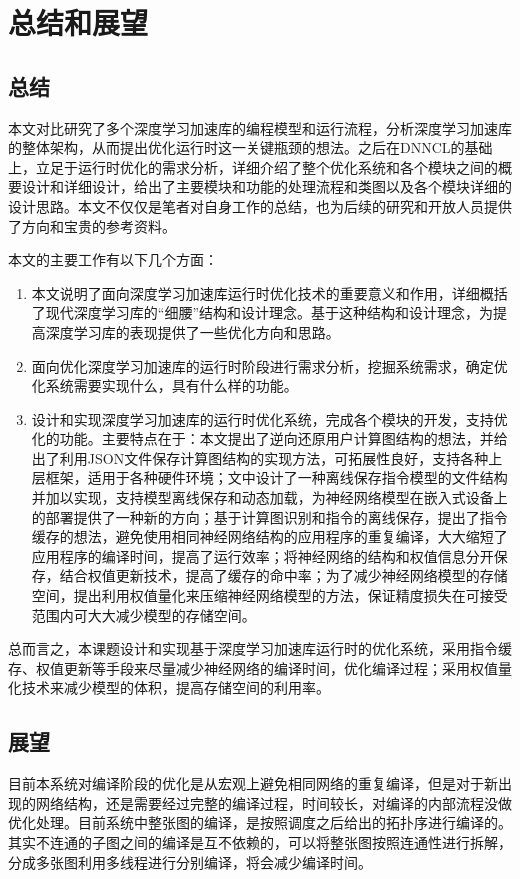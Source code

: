 
\chapter{总结和展望}

\section {总结}

本文对比研究了多个深度学习加速库的编程模型和运行流程，分析深度学习加速库的整体架构，从而提出优化运行时这一关键瓶颈的想法。之后在DNNCL的基础上，立足于运行时优化的需求分析，详细介绍了整个优化系统和各个模块之间的概要设计和详细设计，给出了主要模块和功能的处理流程和类图以及各个模块详细的设计思路。本文不仅仅是笔者对自身工作的总结，也为后续的研究和开放人员提供了方向和宝贵的参考资料。

本文的主要工作有以下几个方面：
\begin{enumerate}
  \item 本文说明了面向深度学习加速库运行时优化技术的重要意义和作用，详细概括了现代深度学习库的“细腰”结构和设计理念。基于这种结构和设计理念，为提高深度学习库的表现提供了一些优化方向和思路。
  \item 面向优化深度学习加速库的运行时阶段进行需求分析，挖掘系统需求，确定优化系统需要实现什么，具有什么样的功能。
  \item 设计和实现深度学习加速库的运行时优化系统，完成各个模块的开发，支持优化的功能。主要特点在于：本文提出了逆向还原用户计算图结构的想法，并给出了利用JSON文件保存计算图结构的实现方法，可拓展性良好，支持各种上层框架，适用于各种硬件环境；文中设计了一种离线保存指令模型的文件结构并加以实现，支持模型离线保存和动态加载，为神经网络模型在嵌入式设备上的部署提供了一种新的方向；基于计算图识别和指令的离线保存，提出了指令缓存的想法，避免使用相同神经网络结构的应用程序的重复编译，大大缩短了应用程序的编译时间，提高了运行效率；将神经网络的结构和权值信息分开保存，结合权值更新技术，提高了缓存的命中率；为了减少神经网络模型的存储空间，提出利用权值量化来压缩神经网络模型的方法，保证精度损失在可接受范围内可大大减少模型的存储空间。
\end{enumerate}

总而言之，本课题设计和实现基于深度学习加速库运行时的优化系统，采用指令缓存、权值更新等手段来尽量减少神经网络的编译时间，优化编译过程；采用权值量化技术来减少模型的体积，提高存储空间的利用率。

\section{展望}
目前本系统对编译阶段的优化是从宏观上避免相同网络的重复编译，但是对于新出现的网络结构，还是需要经过完整的编译过程，时间较长，对编译的内部流程没做优化处理。目前系统中整张图的编译，是按照调度之后给出的拓扑序进行编译的。其实不连通的子图之间的编译是互不依赖的，可以将整张图按照连通性进行拆解，分成多张图利用多线程进行分别编译，将会减少编译时间。


